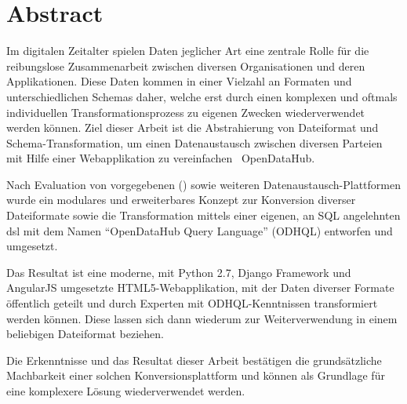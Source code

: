 \begin{comment}
2.1.2 Abstract
Ein Abstract ist eine rein textuelle kurze Zusammenfassung der Arbeit. Der Abstract ist für die Recherche in grossen Dokumentensammlungen geeignet. Er umfasst nie mehr als eine Seite, typisch sogar nur etwa 200 Worte (etwa 20 Zeilen).
Der Begriff ‚Kurzfassung’ ist zuwenig genau definiert; er soll wenn möglich vermieden werden.
\end{comment}


{}
\chapter*{Abstract}

Im digitalen Zeitalter spielen Daten jeglicher Art eine zentrale Rolle für die reibungslose Zusammenarbeit zwischen diversen Organisationen und deren Applikationen. Diese Daten kommen in einer Vielzahl an Formaten und unterschiedlichen Schemas daher, welche erst durch einen komplexen und oftmals individuellen Transformationsprozess zu eigenen Zwecken wiederverwendet werden können. Ziel dieser Arbeit ist die Abstrahierung von Dateiformat und Schema-Transformation, um einen Datenaustausch zwischen diversen Parteien mit Hilfe einer Webapplikation zu vereinfachen \textendash\ OpenDataHub.

\medskip
Nach Evaluation von vorgegebenen () sowie weiteren Datenaustausch-Plattformen wurde ein modulares und erweiterbares Konzept zur Konversion diverser Dateiformate sowie die Transformation mittels einer eigenen, an SQL angelehnten \acl{dsl} mit dem Namen ``OpenDataHub Query Language'' (ODHQL) entworfen und umgesetzt.

\medskip
Das Resultat ist eine moderne, mit Python 2.7, Django Framework und AngularJS umgesetzte HTML5-Webapplikation, mit der Daten diverser Formate öffentlich geteilt und durch Experten mit ODHQL-Kenntnissen transformiert werden können. Diese lassen sich dann wiederum zur Weiterverwendung in einem beliebigen Dateiformat beziehen.

\medskip
Die Erkenntnisse und das Resultat dieser Arbeit bestätigen die grundsätzliche Machbarkeit einer solchen Konversionsplattform und können als Grundlage für eine komplexere Lösung wiederverwendet werden.


\glsresetall